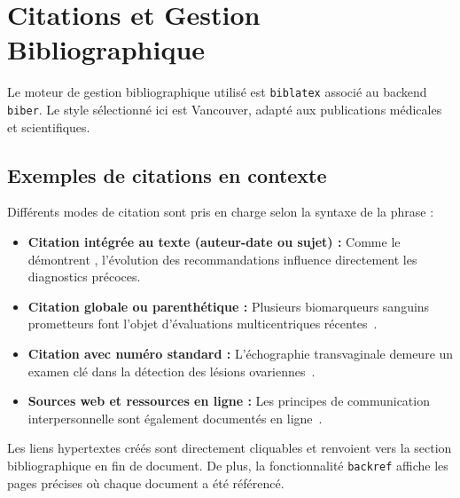 \section{Citations et Gestion Bibliographique}
\label{sec:bibliographie}

Le moteur de gestion bibliographique utilisé est \texttt{biblatex} associé au backend \texttt{biber}.
Le style sélectionné ici est Vancouver, adapté aux publications médicales et scientifiques.

\subsection{Exemples de citations en contexte}
\label{subsec:exemples_citations}

Différents modes de citation sont pris en charge selon la syntaxe de la phrase :
\begin{itemize}
  \item \textbf{Citation intégrée au texte (auteur-date ou sujet) :}
  Comme le démontrent \textcite{nieva2024impact}, l'évolution des recommandations influence directement les diagnostics précoces.
  \item \textbf{Citation globale ou parenthétique :}
  Plusieurs biomarqueurs sanguins prometteurs font l'objet d'évaluations multicentriques récentes~\parencite{burghaus2024}.
  \item \textbf{Citation avec numéro standard :}
  L'échographie transvaginale demeure un examen clé dans la détection des lésions ovariennes~\cite{kanti2024ultrasound}.
  \item \textbf{Sources web et ressources en ligne :}
  Les principes de communication interpersonnelle sont également documentés en ligne~\parencite{demetersante2022}.
\end{itemize}

Les liens hypertextes créés sont directement cliquables et renvoient vers la section bibliographique en fin de document.
De plus, la fonctionnalité \texttt{backref} affiche les pages précises où chaque document a été référencé.

